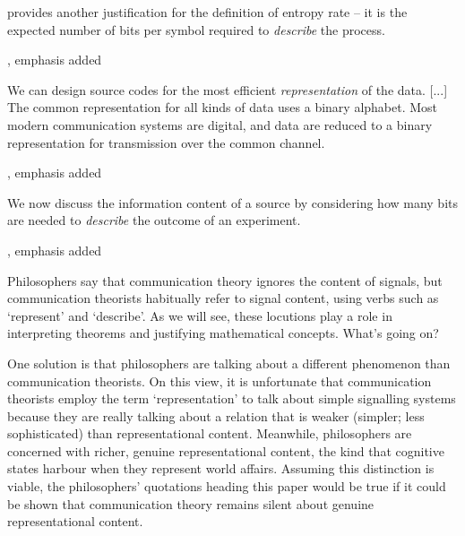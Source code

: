 \documentclass[12pt]{article}
\begin{document}
\begin{myquote}
 provides another justification for the definition of entropy rate -- it is the expected number of bits per symbol required to \textit{describe} the process.
\par\hspace*{\fill}\citet[115]{cover2006elements}, emphasis added
\end{myquote}

\begin{myquote}
We can design source codes for the most efficient \textit{representation} of the data. [...] The common representation for all kinds of data uses a binary alphabet. Most modern communication systems are digital, and data are reduced to a binary representation for transmission over the common channel.
\par\hspace*{\fill}\citet[218]{cover2006elements}, emphasis added
\end{myquote}

\begin{myquote}
We now discuss the information content of a source by considering how many bits are needed to \textit{describe} the outcome of an experiment.
\par\hspace*{\fill}\citet[73]{mackay2003information}, emphasis added
\end{myquote}

\noindent Philosophers say that communication theory ignores the content of signals, but communication theorists habitually refer to signal content, using verbs such as `represent' and `describe'.
As we will see, these locutions play a role in interpreting theorems and justifying mathematical concepts.
What's going on?

One solution is that philosophers are talking about a different phenomenon than communication theorists.
On this view, it is unfortunate that communication theorists employ the term `representation' to talk about simple signalling systems because they are really talking about a relation that is weaker (simpler; less sophisticated) than representational content.
Meanwhile, philosophers are concerned with richer, genuine representational content, the kind that cognitive states harbour when they represent world affairs.
Assuming this distinction is viable, the philosophers' quotations heading this paper would be true if it could be shown that communication theory remains silent about genuine representational content.
\end{document}
